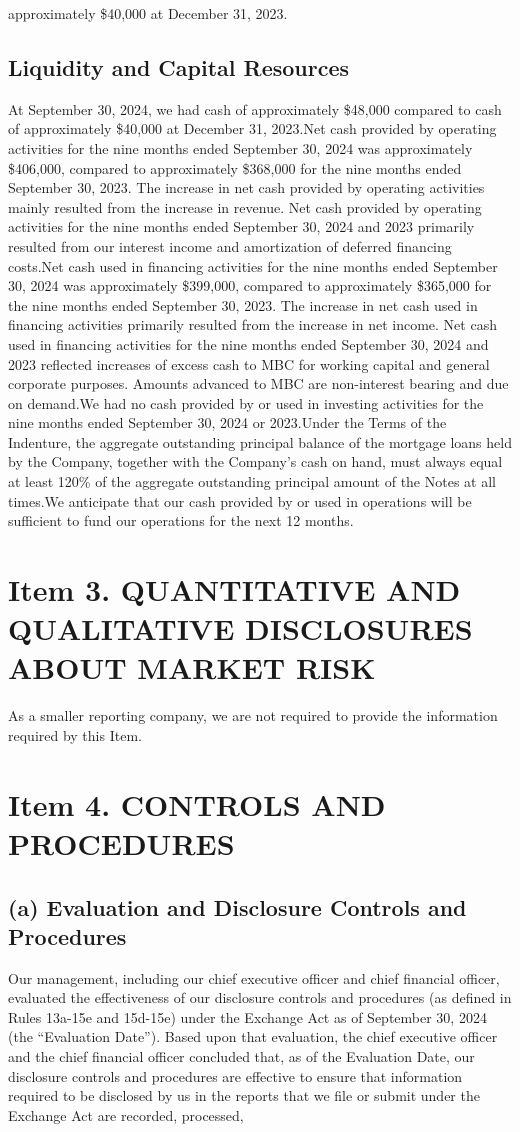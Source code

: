 \documentclass{article}\usepackage{anysize} \usepackage{multirow}\usepackage{float}\usepackage{booktabs}
\begin{document}
approximately \$40,000 at December 31, 2023.\subsection{Liquidity and Capital Resources}At September 30, 2024, we had cash of approximately \$48,000 compared to cash of approximately \$40,000 at December 31, 2023.Net cash provided by operating activities for the nine months ended September 30, 2024 was approximately \$406,000, compared to approximately \$368,000 for the nine months ended September 30, 2023. The increase in net cash provided by operating activities mainly resulted from the increase in revenue. Net cash provided by operating activities for the nine months ended September 30, 2024 and 2023 primarily resulted from our interest income and amortization of deferred financing costs.Net cash used in financing activities for the nine months ended September 30, 2024 was approximately \$399,000, compared to approximately \$365,000 for the nine months ended September 30, 2023. The increase in net cash used in financing activities primarily resulted from the increase in net income. Net cash used in financing activities for the nine months ended September 30, 2024 and 2023 reflected increases of excess cash to MBC for working capital and general corporate purposes. Amounts advanced to MBC are non-interest bearing and due on demand.We had no cash provided by or used in investing activities for the nine months ended September 30, 2024 or 2023.Under the Terms of the Indenture, the aggregate outstanding principal balance of the mortgage loans held by the Company, together with the Company's cash on hand, must always equal at least 120\% of the aggregate outstanding principal amount of the Notes at all times.We anticipate that our cash provided by or used in operations will be sufficient to fund our operations for the next 12 months.\section{Item 3. QUANTITATIVE AND QUALITATIVE DISCLOSURES ABOUT MARKET RISK}As a smaller reporting company, we are not required to provide the information required by this Item.\section{Item 4. CONTROLS AND PROCEDURES}\subsection{(a) Evaluation and Disclosure Controls and Procedures}Our management, including our chief executive officer and chief financial officer, evaluated the effectiveness of our disclosure controls and procedures (as defined in Rules 13a-15e and 15d-15e) under the Exchange Act as of September 30, 2024 (the “Evaluation Date”). Based upon that evaluation, the chief executive officer and the chief financial officer concluded that, as of the Evaluation Date, our disclosure controls and procedures are effective to ensure that information required to be disclosed by us in the reports that we file or submit under the Exchange Act are recorded, processed, 
\end{document}

